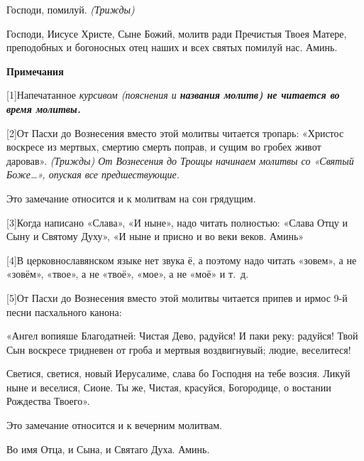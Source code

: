    Господи, помилуй. \itshape  (Трижды)\normalfont{}



   Господи, Иисусе Христе, Сыне Божий, молитв ради Пречистыя Твоея
Матере, преподобных и богоносных отец наших и всех святых помилуй нас.
Аминь.

   


 

\bfseries Примечания\normalfont{}


 [1]Напечатанное \itshape курсивом\normalfont{} (\itshape пояснения\normalfont{} и \itshape \bfseries названия молитв\normalfont{}\normalfont{}) не читается во время
молитвы.


 [2]От Пасхи до Вознесения вместо этой молитвы читается тропарь: «Христос
воскресе из мертвых, смертию смерть поправ, и сущим во гробех живот даровав».
\itshape (Трижды)\normalfont{} От Вознесения до Троицы начинаем молитвы со «Святый Боже…», опуская все
предшествующие.



   Это замечание относится и к молитвам на сон грядущим. 


 [3]Когда написано «Слава», «И ныне», надо читать полностью: «Слава Отцу и Сыну
и Святому Духу», «И ныне и присно и во веки веков. Аминь»


 [4]В церковнославянском языке нет звука ё, а поэтому надо читать «зовем», а не
«зовём», «твое», а не «твоё», «мое», а не «моё» и т. д.


 [5]От Пасхи до Вознесения вместо этой молитвы читается припев и ирмос 9-й песни
пасхального канона:



«Ангел   вопияше   Благодатней:   Чистая   Дево,   радуйся!   И   паки
         реку:  радуйся!  Твой  Сын  воскресе  тридневен  от  гроба  и  мертвыя
         воздвигнувый; людие, веселитеся!
         


Светися, светися, новый Иерусалиме, слава бо Господня на тебе возсия.
         Ликуй ныне и веселися, Сионе. Ты же, Чистая, красуйся, Богородице,
         о востании Рождества Твоего».
         


   Это замечание относится и к вечерним молитвам. 


\mychapterending

 

Во имя Отца, и Сына, и Святаго Духа. Аминь.




